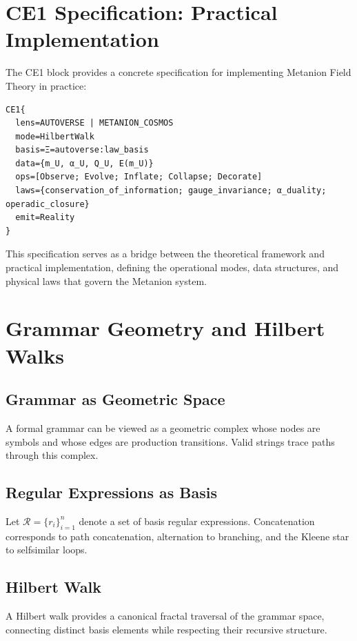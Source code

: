 \documentclass{article}
\begin{document}
\appendix
\section{CE1 Specification: Practical Implementation}
The CE1 block provides a concrete specification for implementing Metanion Field Theory in practice:

\begin{verbatim}
CE1{
  lens=AUTOVERSE | METANION_COSMOS
  mode=HilbertWalk
  basis=Ξ=autoverse:law_basis
  data={m_U, α_U, Q_U, E(m_U)}
  ops=[Observe; Evolve; Inflate; Collapse; Decorate]
  laws={conservation_of_information; gauge_invariance; α_duality; operadic_closure}
  emit=Reality
}
\end{verbatim}

This specification serves as a bridge between the theoretical framework and practical implementation, defining the operational modes, data structures, and physical laws that govern the Metanion system.

\section{Grammar Geometry and Hilbert Walks}
\subsection{Grammar as Geometric Space}
A formal grammar can be viewed as a geometric complex whose nodes are symbols and whose edges are production transitions. Valid strings trace paths through this complex.

\subsection{Regular Expressions as Basis}
Let $\mathcal{R}=\{r_i\}_{i=1}^n$ denote a set of basis regular expressions. Concatenation corresponds to path concatenation, alternation to branching, and the Kleene star to self\textendash similar loops.

\subsection{Hilbert Walk}
A Hilbert walk provides a canonical fractal traversal of the grammar space, connecting distinct basis elements while respecting their recursive structure.
\end{document}
